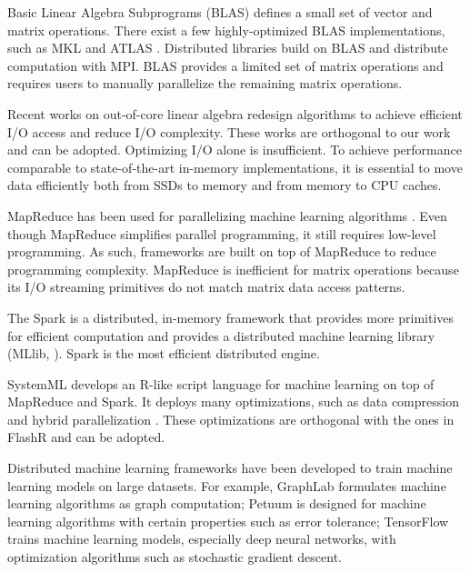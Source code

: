 Basic Linear Algebra Subprograms (BLAS) defines a small set of vector and
matrix operations. There exist a few highly-optimized BLAS implementations,
such as MKL \cite{mkl} and ATLAS \cite{atlas}. 
Distributed libraries \cite{trilinos, petsc, elemental}
build on BLAS and distribute computation with MPI.
BLAS provides a limited set of matrix operations and requires
users to manually parallelize the remaining matrix operations.

Recent works on out-of-core linear algebra \cite{Toledo99, Quintana-Orti12}
redesign algorithms to achieve efficient I/O access and reduce I/O
complexity. These works are orthogonal to our work and can be adopted.
Optimizing I/O
alone is insufficient. To achieve performance comparable to state-of-the-art
in-memory implementations, it is essential to move data efficiently both from
SSDs to memory and from memory to CPU caches.

MapReduce \cite{mapreduce} has been used for parallelizing machine learning
algorithms \cite{Chu06}. Even though MapReduce simplifies parallel programming,
it still requires low-level programming. As such, frameworks are built on top
of MapReduce to reduce programming complexity. MapReduce is inefficient for
matrix operations because
its I/O streaming primitives do not match matrix data access patterns.

The Spark \cite{spark} is a distributed, in-memory framework that provides more
primitives for efficient computation and provides a distributed machine
learning library (MLlib, \cite{mllib}).
Spark is the most efficient distributed engine.

SystemML \cite{systemml, systemml2} develops an R-like script language for
machine learning on top of MapReduce and Spark. It deploys many optimizations,
such as data compression \cite{Elgohary16} and hybrid parallelization
\cite{Boehm14}. These optimizations are orthogonal with the ones in FlashR
and can be adopted.

Distributed machine learning frameworks have been developed to train machine
learning models on large datasets. For example, GraphLab \cite{graphlab}
formulates machine learning algorithms as graph computation; Petuum \cite{petuum}
is designed for machine learning algorithms with certain properties such as
error tolerance; TensorFlow \cite{tensorflow} trains machine learning models,
especially deep neural networks, with optimization algorithms such as
stochastic gradient descent.


